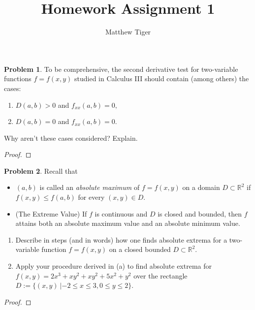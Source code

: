 \documentclass[12pt]{article}
\title{Homework Assignment 1}
\author{Matthew Tiger}
\theoremstyle{definition}
\newtheorem{problem}{Problem}
\begin{document}
\maketitle


\begin{problem}
  To be comprehensive, the second derivative test for two-variable functions $f = f(x, y)$
  studied in Calculus III should contain (among others) the cases:
  \begin{enumerate}
    \item $D(a, b) > 0$ and $f_{xx}(a, b) = 0,$
    \item $D(a, b) = 0$ and $f_{xx}(a, b) = 0.$
  \end{enumerate}
  Why aren't these cases considered? Explain.
\end{problem}

\begin{proof}
\end{proof}
\newpage


\begin{problem}
  Recall that
  \begin{itemize}
    \item $(a, b)$ is called an \textit{absolute maximum} of $f = f(x, y)$ on a domain
      $D \subset \mathbb{R}^2$ if $f(x, y) \leq f(a, b)$
      for every $(x, y) \in D$.
    \item (The Extreme Value) If $f$ is continuous and $D$ is closed and bounded,
      then $f$ attains both an absolute maximum value and an absolute minimum value.
  \end{itemize}
  \begin{enumerate}
    \item Describe in steps (and in words) how one finds absolute extrema for a two-variable
      function $f = f(x, y)$ on a closed bounded $D \subset \mathbb{R}^2$.
    \item Apply your procedure derived in (a) to find absolute extrema for $f(x, y) = 2x^3 + xy^2 + xy^2 + 5x^2 + y^2$
      over the rectangle $D := \{(x, y)\ | -2 \leq x \leq 3, 0 \leq y \leq 2\}$.
  \end{enumerate}
\end{problem}

\begin{proof}
\end{proof}
\newpage
\end{document}
